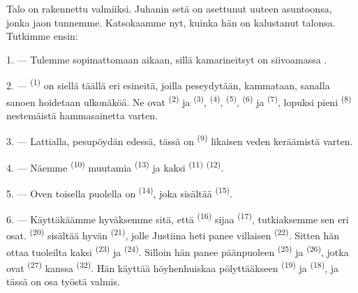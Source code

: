 %

\VUsaut{6.0mm}
\VUsaut{1.4mm}
\VUsaut{0.4mm}
\VUsaut{2.2mm}

Talo on rakennettu valmiiksi. Juhanin setä on asettunut uuteen asuntoonsa, jonka
jaon tunnemme. Katsokaamme nyt, kuinka hän on kalustanut talonsa. Tutkimme
ensin:

\VUsaut{3.0mm}

1. --- Tulemme sopimattomaan aikaan, sillä kamarineitsyt on siivoamassa
.

2. ---  \textsuperscript{(1)} on siellä täällä eri
esineitä, joilla peseydytään, kammataan, sanalla sanoen hoidetaan ulkonäköä. Ne
ovat  \textsuperscript{(2)} ja 
\textsuperscript{(3)},  \textsuperscript{(4)},
 \textsuperscript{(5)},  \textsuperscript{(6)} ja
 \textsuperscript{(7)}, lopuksi pieni 
\textsuperscript{(8)} nestemäistä hammasainetta varten.

3. --- Lattialla, pesupöydän edessä, tässä on 
\textsuperscript{(9)} likaisen veden keräämistä varten.

4. --- Näemme  \textsuperscript{(10)} muutamia
 \textsuperscript{(13)} ja kaksi 
\textsuperscript{(11)}  \textsuperscript{(12)}.

5. --- Oven toisella puolella on  \textsuperscript{(14)},
joka sisältää  \textsuperscript{(15)}.

6. --- Käyttäkäämme hyväksemme sitä, että 
\textsuperscript{(16)} sijaa  \textsuperscript{(17)},
tutkiaksemme sen eri osat.  \textsuperscript{(20)} sisältää
hyvän  \textsuperscript{(21)}, jolle Justiina heti panee
villaisen  \textsuperscript{(22)}. Sitten hän ottaa tuoleilta
kaksi  \textsuperscript{(23)} ja 
\textsuperscript{(24)}. Silloin hän panee päänpuoleen  \textsuperscript{(25)} ja  \textsuperscript{(26)},
jotka ovat  \textsuperscript{(27)} kanssa
 \textsuperscript{(32)}. Hän käyttää höyhenhuiskaa
pölyttääkseen  \textsuperscript{(19)} ja 
\textsuperscript{(18)}, ja tässä on osa työstä valmis.

